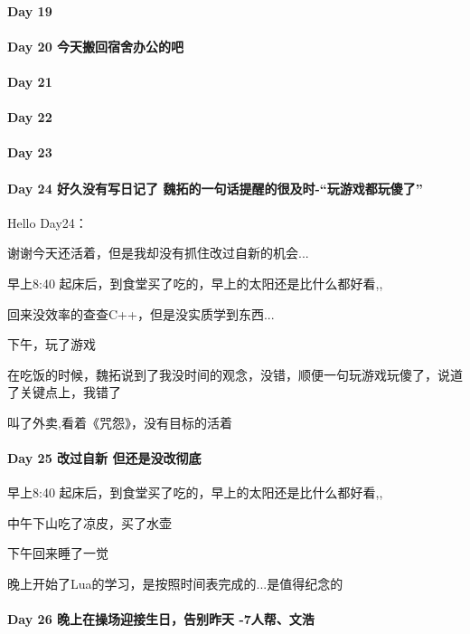 \documentclass[UTF8,a4paper,8pt]{ctexbook}
\begin{document}
 	 \paragraph{Day 19      \quad     }
 	 \paragraph{Day 20      \quad   今天搬回宿舍办公的吧  }
 	 \paragraph{Day 21      \quad     }
 	 \paragraph{Day 22      \quad     }
 	 \paragraph{Day 23      \quad     }
 	 \paragraph{Day 24   好久没有写日记了   \quad    魏拓的一句话提醒的很及时-“玩游戏都玩傻了” }
	 	 Hello Day24：
	 	 
	 	 谢谢今天还活着，但是我却没有抓住改过自新的机会...
	 	 
	 	 早上8:40 起床后，到食堂买了吃的，早上的太阳还是比什么都好看,,
	 	 
	 	 回来没效率的查查C++，但是没实质学到东西...
	 	 
	 	 下午，玩了游戏
	 	 
	 	 在吃饭的时候，魏拓说到了我没时间的观念，没错，顺便一句玩游戏玩傻了，说道了关键点上，我错了
	 	 
	 	 叫了外卖,看着《咒怨》，没有目标的活着
 	 \paragraph{Day 25   改过自新   \quad 但还是没改彻底     }
		 早上8:40 起床后，到食堂买了吃的，早上的太阳还是比什么都好看,,
		 
		 中午下山吃了凉皮，买了水壶
		 
		 下午回来睡了一觉
		 
		 晚上开始了Lua的学习，是按照时间表完成的...是值得纪念的
 	 \paragraph{Day 26      \quad   晚上在操场迎接生日，告别昨天  -7人帮、文浩 }
\end{document}
